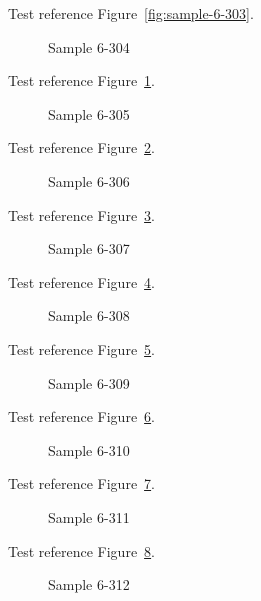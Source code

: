 Test reference Figure~\ref{fig:sample-6-303}.

\begin{figure}[tbhp]
\caption{Sample 6-304}
\label{fig:sample-6-304}
\end{figure}

Test reference Figure~\ref{fig:sample-6-304}.

\begin{figure}[tbhp]
\caption{Sample 6-305}
\label{fig:sample-6-305}
\end{figure}

Test reference Figure~\ref{fig:sample-6-305}.

\begin{figure}[tbhp]
\caption{Sample 6-306}
\label{fig:sample-6-306}
\end{figure}

Test reference Figure~\ref{fig:sample-6-306}.

\begin{figure}[tbhp]
\caption{Sample 6-307}
\label{fig:sample-6-307}
\end{figure}

Test reference Figure~\ref{fig:sample-6-307}.

\begin{figure}[tbhp]
\caption{Sample 6-308}
\label{fig:sample-6-308}
\end{figure}

Test reference Figure~\ref{fig:sample-6-308}.

\begin{figure}[tbhp]
\caption{Sample 6-309}
\label{fig:sample-6-309}
\end{figure}

Test reference Figure~\ref{fig:sample-6-309}.

\begin{figure}[tbhp]
\caption{Sample 6-310}
\label{fig:sample-6-310}
\end{figure}

Test reference Figure~\ref{fig:sample-6-310}.

\begin{figure}[tbhp]
\caption{Sample 6-311}
\label{fig:sample-6-311}
\end{figure}

Test reference Figure~\ref{fig:sample-6-311}.

\begin{figure}[tbhp]
\caption{Sample 6-312}
\label{fig:sample-6-312}
\end{figure}

